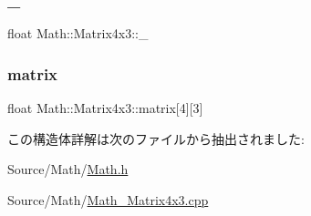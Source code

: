\mbox{\label{struct_math_1_1_matrix4x3_af7df8e1b1cce9c87542c92b8fea4d693}} 
\subsubsection{\texorpdfstring{\+\_}{\_43}}
{\footnotesize\ttfamily float Math\+::\+Matrix4x3\+::\+\_}

\mbox{\label{struct_math_1_1_matrix4x3_af135478d681c61993cc9c29e9dfbd125}} 
\subsubsection{\texorpdfstring{matrix}{matrix}}
{\footnotesize\ttfamily float Math\+::\+Matrix4x3\+::matrix\mbox{[}4\mbox{]}\mbox{[}3\mbox{]}}



この構造体詳解は次のファイルから抽出されました\+:\begin{DoxyCompactItemize}
\item 
Source/\+Math/\mbox{\hyperlink{_math_8h}{Math.\+h}}\item 
Source/\+Math/\mbox{\hyperlink{_math___matrix4x3_8cpp}{Math\+\_\+\+Matrix4x3.\+cpp}}\end{DoxyCompactItemize}
